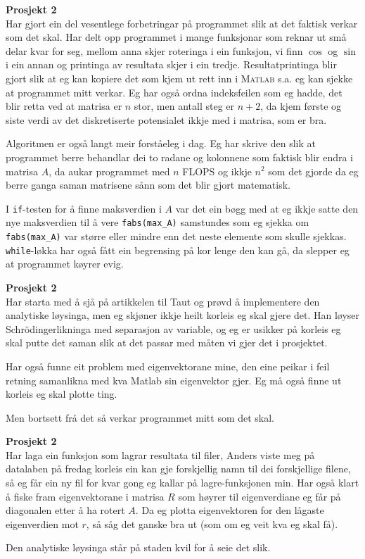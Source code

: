 \documentclass{tufte-book}
\newenvironment{loggentry}[2]%
{\noindent\textbf{#2}\marginnote{#1}\\}{\vspace{0.5cm}}
\begin{document}
\begin{loggentry}{25.09.2015}{Prosjekt 2}
Har gjort ein del vesentlege forbetringar på programmet slik at det faktisk verkar som det skal. Har delt opp programmet i mange funksjonar som reknar ut små delar kvar for seg, mellom anna skjer roteringa i ein funksjon, vi finn $\cos$ og $\sin$ i ein annan og printinga av resultata skjer i ein tredje. Resultatprintinga blir gjort slik at eg kan kopiere det som kjem ut rett inn i \textsc{Matlab} s.a. eg kan sjekke at programmet mitt verkar. Eg har også ordna indeksfeilen som eg hadde, det blir retta ved at matrisa er $n$ stor, men antall steg er $n+2$, da kjem første og siste verdi av det diskretiserte potensialet ikkje med i matrisa, som er bra.

Algoritmen er også langt meir forståeleg i dag. Eg har skrive den slik at programmet berre behandlar dei to radane og kolonnene som faktisk blir endra i matrisa $A$, da aukar programmet med $n$ FLOPS og ikkje $n^2$ som det gjorde da eg berre ganga saman matrisene sånn som det blir gjort matematisk.

I \verb|if|-testen for å finne maksverdien i $A$ var det ein bøgg med at eg ikkje satte den nye maksverdien til å vere \verb|fabs(max_A)| samstundes som eg sjekka om  \verb|fabs(max_A)| var større eller mindre enn det neste elemente som skulle sjekkas. \verb|while|-løkka har også fått ein begrensing på kor lenge den kan gå, da slepper eg at programmet køyrer evig.
\end{loggentry}

\begin{loggentry}{28.09.2015}{Prosjekt 2}
Har starta med å sjå på artikkelen til Taut og prøvd å implementere den analytiske løysinga, men eg skjøner ikkje heilt korleis eg skal gjere det. Han løyser Schrödingerlikninga med separasjon av variable, og eg er usikker på korleis eg skal putte det saman slik at det passar med måten vi gjer det i prosjektet.

Har også funne eit problem med eigenvektorane mine, den eine peikar i feil retning samanlikna med kva Matlab sin eigenvektor gjer. Eg må også finne ut korleis eg skal plotte ting.

Men bortsett frå det så verkar programmet mitt som det skal.
\end{loggentry}

\begin{loggentry}{29.09.2015}{Prosjekt 2}
Har laga ein funksjon som lagrar resultata til filer, Anders viste meg på datalaben på fredag korleis ein kan gje forskjellig namn til dei forskjellige filene, så eg får ein ny fil for kvar gong eg kallar på lagre-funksjonen min. Har også klart å fiske fram eigenvektorane i matrisa $R$ som høyrer til eigenverdiane eg får på diagonalen etter å ha rotert $A$. Da eg plotta eigenvektoren for den lågaste eigenverdien mot $r$, så såg det ganske bra ut (som om eg veit kva eg skal få).

Den analytiske løysinga står på staden kvil for å seie det slik.
\end{loggentry}
\end{document}
